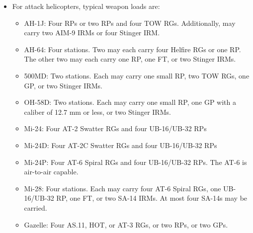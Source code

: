 \begin{landscape}
\begin{fullwidthtable}
\begin{tablenote}{\linewidth}
\begin{itemize}
    \item For attack helicopters, typical weapon loads are:
    \begin{itemize}
        \item AH-1J: Four RPs or two RPs and four TOW RGs. Additionally, may carry two AIM-9 IRMs or four Stinger IRM.
        \item AH-64: Four stations. Two may each carry four Helfire RGs or one RP. The other two may each carry one RP, one FT, or two Stinger IRMs.
        \item 500MD: Two stations. Each may carry one small RP, two TOW RGs, one GP, or two Stinger IRMs.
        \item OH-58D: Two stations. Each may carry one small RP, one GP with a caliber of 12.7 mm or less, or two Stinger IRMs.
        \item Mi-24: Four AT-2 Swatter RGs and four UB-16/UB-32 RPs
        \item Mi-24D: Four AT-2C Swatter RGs and four UB-16/UB-32 RPs
        \item Mi-24P: Four AT-6 Spiral RGs and four UB-16/UB-32 RPs. The AT-6 is air-to-air capable.
        \item Mi-28: Four stations. Each may carry four AT-6 Spiral RGs, one UB-16/UB-32 RP, one FT, or two SA-14 IRMs. At most four SA-14s may be carried.
        \item Gazelle: Four AS.11, HOT, or AT-3 RGs, or two RPs, or two GPs.
    \end{itemize}
\end{itemize}
\end{tablenote}

\end{fullwidthtable}

\end{landscape}
